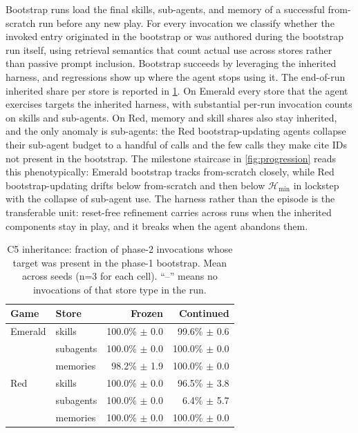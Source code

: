 \documentclass[11pt]{article}
\begin{document}
Bootstrap runs load the final skills, sub-agents, and memory of a successful from-scratch run before any new play. For every invocation we classify whether the invoked entry originated in the bootstrap or was authored during the bootstrap run itself, using retrieval semantics that count actual use across stores rather than passive prompt inclusion. Bootstrap succeeds by leveraging the inherited harness, and regressions show up where the agent stops using it. The end-of-run inherited share per store is reported in \cref{tab:c5_inheritance}. On Emerald every store that the agent exercises targets the inherited harness, with substantial per-run invocation counts on skills and sub-agents. On Red, memory and skill shares also stay inherited, and the only anomaly is sub-agents: the Red bootstrap-updating agents collapse their sub-agent budget to a handful of calls and the few calls they make cite IDs not present in the bootstrap. The milestone staircase in \cref{fig:progression} reads this phenotypically: Emerald bootstrap tracks from-scratch closely, while Red bootstrap-updating drifts below from-scratch and then below $\mathcal{H}_{\min}$ in lockstep with the collapse of sub-agent use. The harness rather than the episode is the transferable unit: reset-free refinement carries across runs when the inherited components stay in play, and it breaks when the agent abandons them.



\begin{table}[t]
\centering
\small
\caption{C5 inheritance: fraction of phase-2 invocations whose target was present in the phase-1 bootstrap. Mean across seeds (n=3 for each cell). ``--'' means no invocations of that store type in the run.}
\label{tab:c5_inheritance}
\begin{tabular}{llrr}
\toprule
Game & Store & Frozen & Continued \\
\midrule
Emerald & skills & 100.0\% $\pm$ 0.0 & 99.6\% $\pm$ 0.6 \\
 & subagents & 100.0\% $\pm$ 0.0 & 100.0\% $\pm$ 0.0 \\
 & memories & 98.2\% $\pm$ 1.9 & 100.0\% $\pm$ 0.0 \\
\midrule
Red & skills & 100.0\% $\pm$ 0.0 & 96.5\% $\pm$ 3.8 \\
 & subagents & 100.0\% $\pm$ 0.0 & 6.4\% $\pm$ 5.7 \\
 & memories & 100.0\% $\pm$ 0.0 & 100.0\% $\pm$ 0.0 \\
\bottomrule
\end{tabular}
\end{table}
\end{document}
